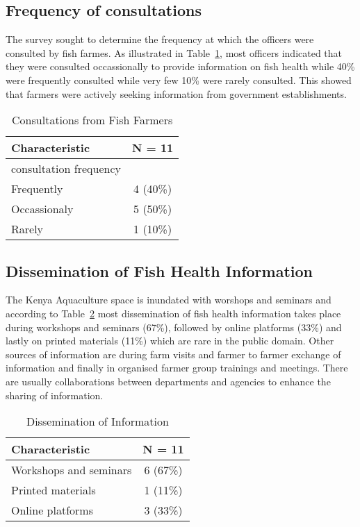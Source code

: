 \documentclass[
  letterpaper,
  DIV=11,
  numbers=noendperiod]{scrartcl}
\begin{document}
\subsection{Frequency of
consultations}\label{frequency-of-consultations}

The survey sought to determine the frequency at which the officers were
consulted by fish farmes. As illustrated in Table~\ref{tbl-consult},
most officers indicated that they were consulted occassionally to
provide information on fish health while 40\% were frequently consulted
while very few 10\% were rarely consulted. This showed that farmers were
actively seeking information from government establishments.

\begin{longtable}[]{@{}lc@{}}

\caption{\label{tbl-consult}Consultations from Fish Farmers}

\tabularnewline

\toprule\noalign{}
\textbf{Characteristic} & \textbf{N = 11} \\
\midrule\noalign{}
\endhead
\bottomrule\noalign{}
\endlastfoot
consultation frequency & \\
Frequently & 4 (40\%) \\
Occassionaly & 5 (50\%) \\
Rarely & 1 (10\%) \\

\end{longtable}

\subsection{Dissemination of Fish Health
Information}\label{dissemination-of-fish-health-information}

The Kenya Aquaculture space is inundated with worshops and seminars and
according to Table~\ref{tbl-disse} most dissemination of fish health
information takes place during workshops and seminars (67\%), followed
by online platforms (33\%) and lastly on printed materials (11\%) which
are rare in the public domain. Other sources of information are during
farm visits and farmer to farmer exchange of information and finally in
organised farmer group trainings and meetings. There are usually
collaborations between departments and agencies to enhance the sharing
of information.

\begin{longtable}[]{@{}lc@{}}

\caption{\label{tbl-disse}Dissemination of Information}

\tabularnewline

\toprule\noalign{}
\textbf{Characteristic} & \textbf{N = 11} \\
\midrule\noalign{}
\endhead
\bottomrule\noalign{}
\endlastfoot
Workshops and seminars & 6 (67\%) \\
Printed materials & 1 (11\%) \\
Online platforms & 3 (33\%) \\

\end{longtable}
\end{document}
